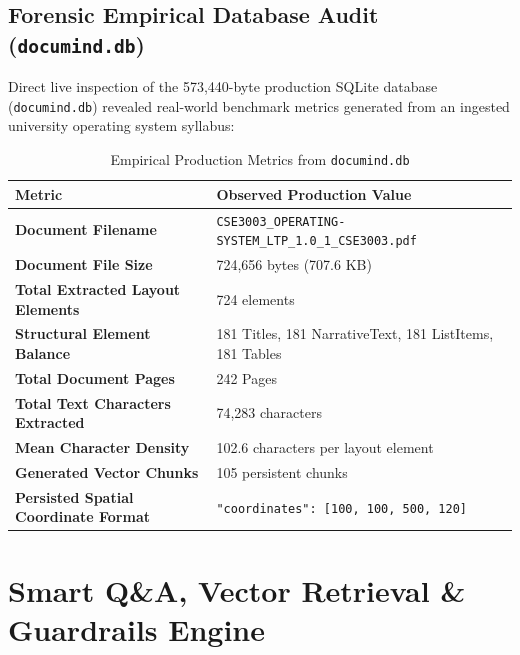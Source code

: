\documentclass[11pt,a4paper]{article}
\begin{document}
\subsection{Forensic Empirical Database Audit (\texttt{documind.db})}
Direct live inspection of the 573,440-byte production SQLite database (\texttt{documind.db}) revealed real-world benchmark metrics generated from an ingested university operating system syllabus:

\begin{table}[h!]
\centering
\small
\begin{tabular}{ll}
\toprule
\textbf{Metric} & \textbf{Observed Production Value} \\
\midrule
\textbf{Document Filename} & \texttt{CSE3003\_OPERATING-SYSTEM\_LTP\_1.0\_1\_CSE3003.pdf} \\
\textbf{Document File Size} & 724,656 bytes (707.6 KB) \\
\textbf{Total Extracted Layout Elements} & 724 elements \\
\textbf{Structural Element Balance} & 181 Titles, 181 NarrativeText, 181 ListItems, 181 Tables \\
\textbf{Total Document Pages} & 242 Pages \\
\textbf{Total Text Characters Extracted} & 74,283 characters \\
\textbf{Mean Character Density} & 102.6 characters per layout element \\
\textbf{Generated Vector Chunks} & 105 persistent chunks \\
\textbf{Persisted Spatial Coordinate Format} & \texttt{"coordinates": [100, 100, 500, 120]} \\
\bottomrule
\end{tabular}
\caption{Empirical Production Metrics from \texttt{documind.db}}
\end{table}

\section{Smart Q\&A, Vector Retrieval \& Guardrails Engine}
\end{document}
